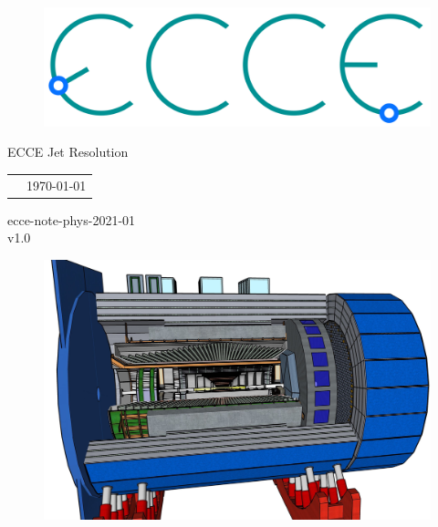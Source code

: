 \renewcommand*\familydefault{\sfdefault}
{\sffamily
\vfill
\vspace{4cm}
\begin{figure}[H]
  \begin{center}
  \includegraphics[width=0.3\linewidth]{figs/ecce-logo.png}
\end{center}
\end{figure}

\begin{center}
  \large
  {\LARGE{ECCE Jet Resolution}}

  \begin{tabular}{cc}

& \today%
  \end{tabular}
  \end{center}

\vspace{15cm}
\hspace*{0pt}\hfill ecce-note-phys-2021-01 \\
\hspace*{0pt}\hfill v1.0
\vspace{-15cm}

\vspace{1cm}

\begin{figure}[H]
  \begin{center}
    \includegraphics[width=0.9\linewidth]{figs/ECCE.jpeg}
  \end{center}
\end{figure}
}


\vfill
\renewcommand*\familydefault{\rmdefault}